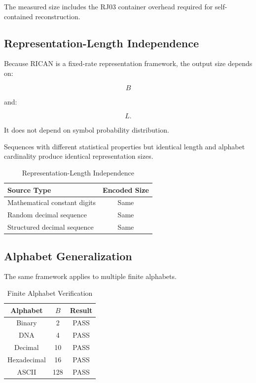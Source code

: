 \documentclass[onecolumn]{IEEEtran}
\begin{document}
The measured size includes the RJ03 container overhead required for
self-contained reconstruction.

\subsection{Representation-Length Independence}

Because RICAN is a fixed-rate representation framework, the output size
depends on:

\[
B
\]

and:

\[
L .
\]

It does not depend on symbol probability distribution.

Sequences with different statistical properties but identical length
and alphabet cardinality produce identical representation sizes.

\begin{table}[!t]
\caption{Representation-Length Independence}
\label{tab:independence}
\centering
\begin{tabular}{lc}
\toprule
Source Type & Encoded Size\\
\midrule
Mathematical constant digits & Same\\
Random decimal sequence & Same\\
Structured decimal sequence & Same\\
\bottomrule
\end{tabular}
\end{table}

\subsection{Alphabet Generalization}

The same framework applies to multiple finite alphabets.

\begin{table}[!t]
\caption{Finite Alphabet Verification}
\label{tab:alphabet}
\centering
\begin{tabular}{ccc}
\toprule
Alphabet & $B$ & Result\\
\midrule
Binary & 2 & PASS\\
DNA & 4 & PASS\\
Decimal & 10 & PASS\\
Hexadecimal &16& PASS\\
ASCII &128& PASS\\
\bottomrule
\end{tabular}
\end{table}
\end{document}

